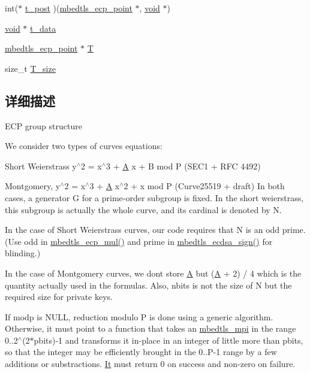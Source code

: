 \begin{DoxyCompactItemize}
\item 
int($\ast$ \hyperlink{structmbedtls__ecp__group_aa67390761ba1d1f8b724d1550e451908}{t\+\_\+post} )(\hyperlink{structmbedtls__ecp__point}{mbedtls\+\_\+ecp\+\_\+point} $\ast$, \hyperlink{interfacevoid}{void} $\ast$)
\item 
\hyperlink{interfacevoid}{void} $\ast$ \hyperlink{structmbedtls__ecp__group_a7400fa2acba24d9b8a7a107d9fcde36f}{t\+\_\+data}
\item 
\hyperlink{structmbedtls__ecp__point}{mbedtls\+\_\+ecp\+\_\+point} $\ast$ \hyperlink{structmbedtls__ecp__group_a4beb01054d800f047b5479f4e0e8d7d8}{T}
\item 
size\+\_\+t \hyperlink{structmbedtls__ecp__group_a4b9a1bf79d2023dbc3807dc7e12059af}{T\+\_\+size}
\end{DoxyCompactItemize}


\subsection{详细描述}
E\+CP group structure 

We consider two types of curves equations\+:
\begin{DoxyEnumerate}
\item Short Weierstrass y$^\wedge$2 = x$^\wedge$3 + \hyperlink{struct_a}{A} x + B mod P (S\+E\+C1 + R\+FC 4492)
\item Montgomery, y$^\wedge$2 = x$^\wedge$3 + \hyperlink{struct_a}{A} x$^\wedge$2 + x mod P (Curve25519 + draft) In both cases, a generator G for a prime-\/order subgroup is fixed. In the short weierstrass, this subgroup is actually the whole curve, and its cardinal is denoted by N.
\end{DoxyEnumerate}

In the case of Short Weierstrass curves, our code requires that N is an odd prime. (Use odd in \hyperlink{ecp_8h_a4d005045c302e100c78bdc587e8f0e6a}{mbedtls\+\_\+ecp\+\_\+mul()} and prime in \hyperlink{ecdsa_8h_af10f6fda2169862871d0ac07555c8641}{mbedtls\+\_\+ecdsa\+\_\+sign()} for blinding.)

In the case of Montgomery curves, we don\textquotesingle{}t store \hyperlink{struct_a}{A} but (\hyperlink{struct_a}{A} + 2) / 4 which is the quantity actually used in the formulas. Also, nbits is not the size of N but the required size for private keys.

If modp is N\+U\+LL, reduction modulo P is done using a generic algorithm. Otherwise, it must point to a function that takes an \hyperlink{structmbedtls__mpi}{mbedtls\+\_\+mpi} in the range 0..2$^\wedge$(2$\ast$pbits)-\/1 and transforms it in-\/place in an integer of little more than pbits, so that the integer may be efficiently brought in the 0..P-\/1 range by a few additions or substractions. \hyperlink{class_it}{It} must return 0 on success and non-\/zero on failure. 

